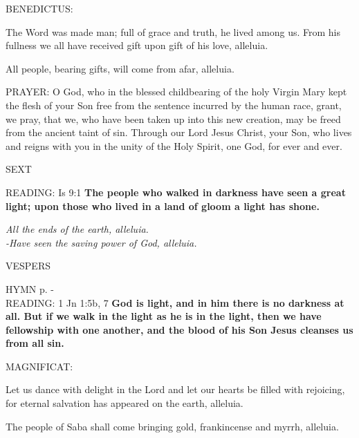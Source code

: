 \noindent\small{\uppercase{BENEDICTUS:}}\begin{description}[labelindent=\parindent, leftmargin=*]
\item [(before the Epiphany)] The Word was made man; full of grace and truth, he lived among us. From his fullness we all have received gift upon gift of his love, alleluia.
\item [(Thursday after the Epiphany)] All people, bearing gifts, will come from afar, alleluia.
\end{description}

\noindent\small{\uppercase{PRAYER:}}	O God, who in the blessed childbearing of the holy Virgin Mary kept the flesh of your Son free from the sentence incurred by the human race, grant, we pray, that we, who have been taken up into this new creation, may be freed from the ancient taint of sin. Through our Lord Jesus Christ, your Son, who lives and reigns with you in the unity of the Holy Spirit, one God, for ever and ever.

\begin{flushleft}\normalsize{\uppercase{SEXT\\}}\end{flushleft}
\noindent\small{\uppercase{READING:}}    Is 9:1 \textbf{   The people who walked in darkness have seen a great light; upon those who lived in a land of gloom a light has shone.}
\begin{center}\textit{All the ends of the earth, alleluia.\\
-Have seen the saving power of God, alleluia.}\end{center}

\begin{flushleft}\normalsize{\uppercase{VESPERS\\}}\end{flushleft}
\small{\uppercase{HYMN} p. \pageref{christmas:firstHymn}-\pageref{christmas:lastHymn}\\}
\noindent\small{\uppercase{READING:}}    1 Jn 1:5b, 7 \textbf{   God is light, and in him there is no darkness at all. But if we walk in the light as he is in the light, then we have fellowship with one another, and the blood of his Son Jesus cleanses us from all sin.\\}

\noindent\small{\uppercase{MAGNIFICAT:}}\begin{description}[labelindent=\parindent, leftmargin=*]
\item [(before the Epiphany)] Let us dance with delight in the Lord and let our hearts be filled with rejoicing, for eternal salvation has appeared on the earth, alleluia.
\item [(Thursday after the Epiphany)] The people of Saba shall come bringing gold, frankincense and myrrh, alleluia.
\end{description}

